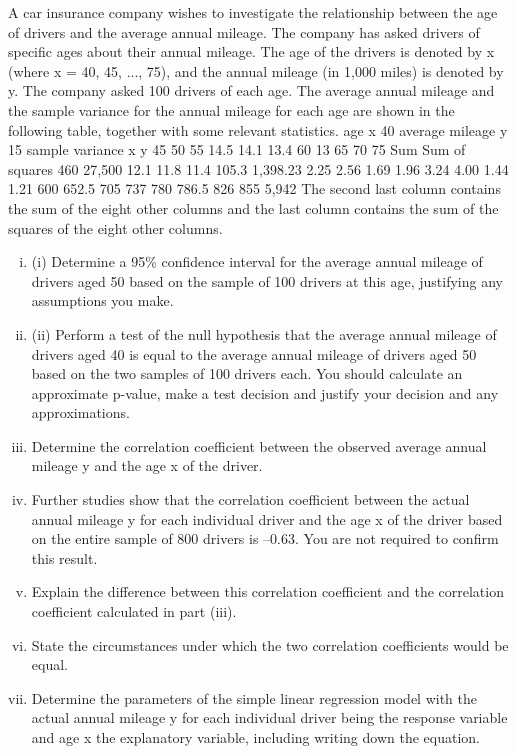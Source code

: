 \documentclass[a4paper,12pt]{article}
\begin{document}

A car insurance company wishes to investigate the relationship between the age of drivers and the average annual mileage. The company has asked drivers of specific ages about their annual mileage. The age of the drivers is denoted by x (where x = 40,
45, ..., 75), and the annual mileage (in 1,000 miles) is denoted by y. The company asked 100 drivers of each age.
The average annual mileage and the sample variance for the annual mileage for each age are shown in the following table, together with some relevant statistics.
age x 40
average mileage y 15
sample variance
x \; \times \; y
45
50
55
14.5 14.1 13.4
60
13
65
70
75
Sum Sum of squares
460 27,500
12.1 11.8 11.4 105.3
1,398.23
2.25 2.56 1.69 1.96 3.24 4.00 1.44 1.21
600 652.5 705
737
780 786.5 826
855 5,942
The second last column contains the sum of the eight other columns and the last
column contains the sum of the squares of the eight other columns.

\begin{enumerate}[(i)]
\item (i) Determine a 95\%  confidence interval for the average annual mileage of
drivers aged 50 based on the sample of 100 drivers at this age, justifying any
assumptions you make.


\item (ii) Perform a test of the null hypothesis that the average annual mileage of drivers aged 40 is equal to the average annual mileage of drivers aged 50 based on the two samples of 100 drivers each. You should calculate an approximate
p-value, make a test decision and justify your decision and any
approximations.
\item 
Determine the correlation coefficient between the observed average annual
mileage y and the age x of the driver.
\item 

Further studies show that the correlation coefficient between the actual annual mileage
y for each individual driver and the age x of the driver based on the entire sample of 800 drivers is –0.63. You are not required to confirm this result.
\item 
Explain the difference between this correlation coefficient and the correlation coefficient calculated in part (iii). 
\item 

State the circumstances under which the two correlation coefficients would be equal.
\item 
Determine the parameters of the simple linear regression model with the actual annual mileage y for each individual driver being the response variable and age x the explanatory variable, including writing down the equation. 
\end{enumerate}
\end{document}
